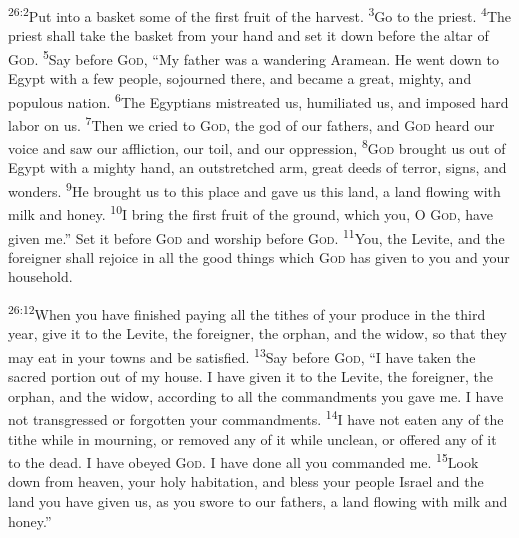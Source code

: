 \documentclass[openany,12pt,english]{book}
\newenvironment{para}{\par\pretolerance=100\tolerance=200\setlength{\emergencystretch}{0.6em}\relax}{\par}
\begin{document}
\bigskip{}

\begin{para}
    \textsuperscript{26:2}\thinspace{}Put in\-to a bas\-ket some of the first fruit of the har\-vest.
    \textsuperscript{3}\thinspace{}Go to the priest.
    \textsuperscript{4}\thinspace{}The priest shall take the bas\-ket from your hand and set it down be\-fore the al\-tar of \textsc{God}.
    \textsuperscript{5}\thinspace{}Say be\-fore \textsc{God}, “My fa\-ther was a wan\-der\-ing Aramean. He went down to Egypt with a few peo\-ple, sojourned there, and be\-came a great, might\-y, and pop\-u\-lous na\-tion.
    \textsuperscript{6}\thinspace{}The Egyptians mistreated us, hu\-mil\-i\-at\-ed us, and im\-posed hard la\-bor on us.
    \textsuperscript{7}\thinspace{}Then we cried to \textsc{God}, the god of our fathers, and \textsc{God} heard our voice and saw our af\-flic\-tion, our toil, and our op\-pres\-sion,
    \textsuperscript{8}\thinspace{}\textsc{God} brought us out of Egypt with a might\-y hand, an out\-stretched arm, great deeds of ter\-ror, signs, and wonders.
    \textsuperscript{9}\thinspace{}He brought us to this place and gave us this land, a land flow\-ing with milk and hon\-ey.
    \textsuperscript{10}\thinspace{}I bring the first fruit of the ground, which you, O \textsc{God}, have giv\-en me.” Set it be\-fore \textsc{God} and wor\-ship be\-fore \textsc{God}.
    \textsuperscript{11}\thinspace{}You, the Levite, and the for\-eign\-er shall re\-joice in all the good things which \textsc{God} has giv\-en to you and your house\-hold.
\end{para}

\begin{para}
    \textsuperscript{26:12}\thinspace{}When you have fin\-ished pay\-ing all the tithes of your pro\-duce in the third year, give it to the Levite, the for\-eign\-er, the or\-phan, and the wid\-ow, so that they may eat in your towns and be sat\-is\-fied.
    \textsuperscript{13}\thinspace{}Say be\-fore \textsc{God}, “I have tak\-en the sa\-cred por\-tion out of my house. I have giv\-en it to the Levite, the for\-eign\-er, the or\-phan, and the wid\-ow, ac\-cord\-ing to all the commandments you gave me. I have not transgressed or for\-got\-ten your commandments.
    \textsuperscript{14}\thinspace{}I have not eat\-en any of the tithe while in mourn\-ing, or re\-moved any of it while un\-clean, or offered any of it to the dead. I have obeyed \textsc{God}. I have done all you commanded me.
    \textsuperscript{15}\thinspace{}Look down from heav\-en, your ho\-ly hab\-i\-ta\-tion, and bless your peo\-ple Israel and the land you have giv\-en us, as you swore to our fathers, a land flow\-ing with milk and hon\-ey.”
\end{para}
\end{document}
